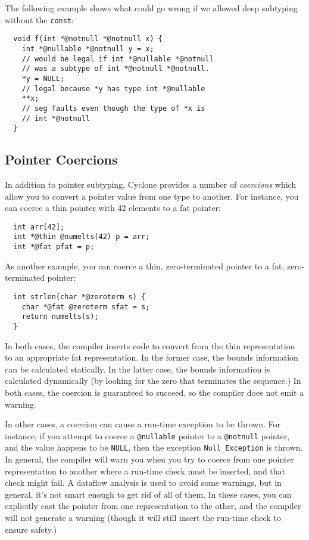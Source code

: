 The following example shows what could go wrong if we allowed
deep subtyping without the \texttt{const}:
\begin{verbatim}
  void f(int *@notnull *@notnull x) {
    int *@nullable *@notnull y = x; 
    // would be legal if int *@nullable *@notnull 
    // was a subtype of int *@notnull *@notnull.
    *y = NULL;    
    // legal because *y has type int *@nullable
    **x;          
    // seg faults even though the type of *x is 
    // int *@notnull
  }
\end{verbatim}

\subsection{Pointer Coercions}

In addition to pointer subtyping, Cyclone provides a number of
\emph{coercions} which allow you to convert a pointer value from one
type to another.  For instance, you can coerce a thin pointer
with 42 elements to a fat pointer:
\begin{verbatim}
  int arr[42];
  int *@thin @numelts(42) p = arr;
  int *@fat pfat = p;
\end{verbatim}
As another example, you can coerce a thin, zero-terminated pointer
to a fat, zero-terminated pointer:
\begin{verbatim}
  int strlen(char *@zeroterm s) {
    char *@fat @zeroterm sfat = s;
    return numelts(s);
  }
\end{verbatim}
In both cases, the compiler inserts code to convert from the
thin representation to an appropriate fat representation.  In
the former case, the bounds information can be calculated
statically.  In the latter case, the bounds information is
calculated dynamically (by looking for the zero that terminates
the sequence.)  In both cases, the coercion is guaranteed to
succeed, so the compiler does not emit a warning.

In other cases, a coercion can cause a run-time exception to be
thrown.  For instance, if you attempt to coerce a \texttt{@nullable}
pointer to a \texttt{@notnull} pointer, and the value happens to be
\texttt{NULL}, then the exception \texttt{Null_Exception} is thrown.
In general, the compiler will warn you when you try to coerce
from one pointer representation to another where a run-time
check must be inserted, and that check might fail.  A dataflow
analysis is used to avoid some warnings, but in general,
it's not smart enough to get rid of all of them.  In these
cases, you can explicitly cast the pointer from one representation
to the other, and the compiler will not generate a warning
(though it will still insert the run-time check to ensure
safety.)

